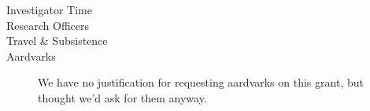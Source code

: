 \begin{description}
	\item[Investigator Time]
	\item[Research Officers]
	\item[Travel \& Subsistence]
		\ifinternal
	\item[Aardvarks]We have no justification for requesting aardvarks on this grant, but thought we'd ask for them anyway.
		\fi
\end{description}

